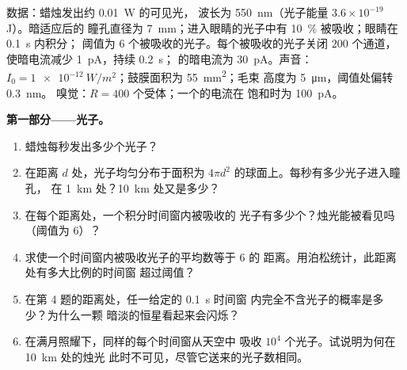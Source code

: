 \begin{problem}
\label{pb:b3:sensory-systems:1}
数据：蜡烛发出约 \qty{0.01}{W} 的可见光，
波长为 \qty{550}{nm}（光子能量 $3.6\times 10^{-19}$ J）。暗适应后的
瞳孔直径为 \qty{7}{mm}；进入眼睛的光子中有 \qty{10}{\%}
被吸收；眼睛在 \qty{0.1}{s} 内积分；
阈值为 $6$ 个被吸收的光子。每个被吸收的光子关闭 $200$
个通道，使暗电流减少 \qty{1}{pA}，持续 \qty{0.2}{s}；
的暗电流为 \qty{30}{pA}。声音：$I_{0} =
\qty{1e-12}{W/m^2}$；鼓膜面积为 \qty{55}{mm^2}；毛束
高度为 \qty{5}{\micro m}，阈值处偏转 \qty{0.3}{nm}。
嗅觉：$R = 400$ 个受体；一个的电流在
饱和时为 \qty{100}{pA}。

\medskip
\noindent\textbf{第一部分——光子。}
\begin{enumerate}
  \item 蜡烛每秒发出多少个光子？
  \item 在距离 $d$ 处，光子均匀分布于面积为
        $4\pi d^{2}$ 的球面上。每秒有多少光子进入瞳孔，
        在 \qty{1}{km} 处？\qty{10}{km} 处又是多少？
  \item 在每个距离处，一个积分时间窗内被吸收的
        光子有多少个？烛光能被看见吗（阈值为 $6$）？
  \item 求使一个时间窗内被吸收光子的平均数等于 $6$ 的
        距离。用泊松统计，此距离处有多大比例的时间窗
        超过阈值？
  \item 在第 4 题的距离处，任一给定的 \qty{0.1}{s} 时间窗
        内完全不含光子的概率是多少？为什么一颗
        暗淡的恒星看起来会闪烁？
  \item 在满月照耀下，同样的每个时间窗从天空中
        吸收 $10^{4}$ 个光子。试说明为何在 \qty{10}{km} 处的烛光
        此时不可见，尽管它送来的光子数相同。
\end{enumerate}


\end{problem}
